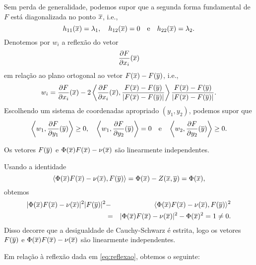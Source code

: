 \vspace{.2cm}

Sem perda de generalidade, podemos supor que a segunda forma
fundamental de $F$ est\'a diagonalizada no ponto $\overline{x}$, i.e.,
\[
h_{11}(\overline{x})=\lambda_1, \quad h_{12}(\overline{x}) = 0 \quad\mbox{e}\quad
h_{22}(\overline{x}) = \lambda_2.
\]
Denotemos por $w_i$ a reflex\~ao do vetor
\[
\frac{\partial F}{\partial x_i}(\overline{x})
\]
em rela\c c\~ao ao plano ortogonal ao vetor $F(\overline{x}) - F(\overline{y})$, i.e.,
\begin{eqnarray}\label{eq:reflexao}
w_i = \frac{\partial F}{\partial x_i}(\overline{x}) - 
2 \left\langle \frac{\partial F}{\partial x_i}(\overline{x}), \frac{F(\overline{x}) - 
	F(\overline{y})}{|F(\overline{x}) - F(\overline{y})|} \right\rangle \frac{F(\overline{x}) - 
	F(\overline{y})}{|F(\overline{x}) - F(\overline{y})|}.
\end{eqnarray}
Escolhendo um sistema de coordenadas apropriado $(y_1,y_2)$,
podemos supor que
\begin{equation*}
\left\langle w_1, \frac{\partial F}{\partial y_1}(\overline{y}) \right\rangle \geq 0, 
\quad 
\left\langle w_1, \frac{\partial F}{\partial y_2}(\overline{y}) \right\rangle = 0 
\quad \text{e} \quad 
\left\langle w_2, \frac{\partial F}{\partial y_2}(\overline{y}) \right\rangle \geq 0.
\end{equation*}

\begin{lema}
	Os vetores $F(\overline{y})$ e $ \Phi(\overline{x}) F(\overline{x}) - \nu(\overline{x}) $ são linearmente independentes.
\end{lema}
\begin{demonstracao}
	Usando a identidade
	\[
	\langle \Phi(\overline{x}) F(\overline{x}) - \nu(\overline{x}), F(\overline{y}) \rangle = 
	\Phi(\overline{x}) - Z(\overline{x},\overline{y}) = \Phi(\overline{x}),
	\]
	obtemos
	\begin{eqnarray*}
		| \Phi(\overline{x}) F(\overline{x}) - \nu(\overline{x}) |^2 | F(\overline{y}) |^2 &-& 
		\langle \Phi(\overline{x}) F(\overline{x}) - \nu(\overline{x}), F(\overline{y}) \rangle^2 \\
		&=& | \Phi(\overline{x}) F(\overline{x}) - \nu(\overline{x}) |^2 - \Phi(\overline{x})^2 = 1 \neq 0.
	\end{eqnarray*}
	Disso decorre que a desigualdade de Cauchy-Schwarz \'e estrita,
	logo os vetores $F(\overline{y})$ e $\Phi(\overline{x})F(\overline{x})-\nu(\overline{x})$
	s\~ao linearmente independentes.
\end{demonstracao}

Em rela\c c\~ao \`a reflex\~ao dada em \eqref{eq:reflexao}, obtemos o
seguinte:


